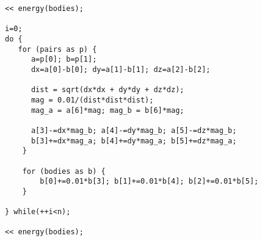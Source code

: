 \begin{lstlisting}[language=omi]
<< energy(bodies);

i=0; 
do {
   for (pairs as p) {
      a=p[0]; b=p[1];
      dx=a[0]-b[0]; dy=a[1]-b[1]; dz=a[2]-b[2];

      dist = sqrt(dx*dx + dy*dy + dz*dz);
      mag = 0.01/(dist*dist*dist);
      mag_a = a[6]*mag; mag_b = b[6]*mag;
	
      a[3]-=dx*mag_b; a[4]-=dy*mag_b; a[5]-=dz*mag_b;
      b[3]+=dx*mag_a; b[4]+=dy*mag_a; b[5]+=dz*mag_a;
    } 

    for (bodies as b) {
        b[0]+=0.01*b[3]; b[1]+=0.01*b[4]; b[2]+=0.01*b[5];
    } 

} while(++i<n);

<< energy(bodies);
\end{lstlisting}

